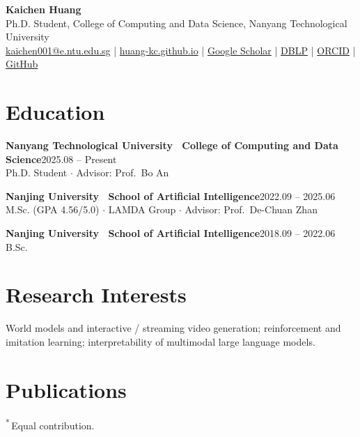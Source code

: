 \documentclass[11pt]{article}
\newcommand{\dt}[1]{\hfill{\color{inkIII}\footnotesize #1}}
\newcommand{\eq}{\textsuperscript{*}}
\newcommand{\entry}[4]{%
  \textbf{\color{ink}#1}\dt{#2}\\[1pt]
  {\color{inkII}\small #3}\\[1pt]
  {\color{inkII}\small #4}\par\vspace{5pt}}
\begin{document}
{\fontsize{26}{30}\selectfont\bfseries\color{ink} Kaichen Huang}\;\\[4pt]
{\color{inkII} Ph.D. Student, College of Computing and Data Science, Nanyang Technological University}\\[3pt]
{\small
\href{mailto:kaichen001@e.ntu.edu.sg}{kaichen001@e.ntu.edu.sg} \;\textcolor{inkIII}{|}\;
\href{https://huang-kc.github.io}{huang-kc.github.io} \;\textcolor{inkIII}{|}\;
\href{https://scholar.google.com/citations?user=PQRU3nEAAAAJ}{Google Scholar} \;\textcolor{inkIII}{|}\;
\href{https://dblp.org/pid/368/5937.html}{DBLP} \;\textcolor{inkIII}{|}\;
\href{https://orcid.org/0009-0001-3226-7899}{ORCID} \;\textcolor{inkIII}{|}\;
\href{https://github.com/huang-kc}{GitHub}}
\vspace{2pt}

\section*{Education}
\entry{Nanyang Technological University \normalfont\textemdash\ College of Computing and Data Science}{2025.08 -- Present}
{Ph.D. Student \textcolor{inkIII}{$\cdot$} Advisor: Prof.\ Bo An}{}

\entry{Nanjing University \normalfont\textemdash\ School of Artificial Intelligence}{2022.09 -- 2025.06}
{M.Sc. (GPA 4.56/5.0) \textcolor{inkIII}{$\cdot$} LAMDA Group \textcolor{inkIII}{$\cdot$} Advisor: Prof.\ De-Chuan Zhan}{}

\entry{Nanjing University \normalfont\textemdash\ School of Artificial Intelligence}{2018.09 -- 2022.06}
{B.Sc.}{}

\section*{Research Interests}
{\color{inkII}\small World models and interactive / streaming video generation; reinforcement and imitation learning; interpretability of multimodal large language models.}

\section*{Publications}
{\color{inkIII}\footnotesize \eq\,Equal contribution.}\vspace{3pt}
\end{document}
